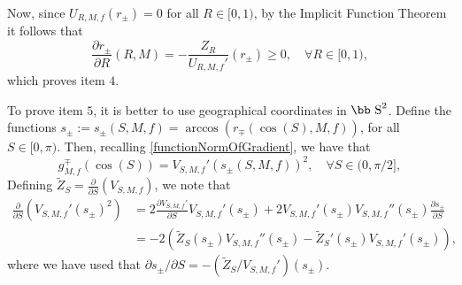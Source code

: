 \documentclass[11pt]{article}
\def\s{\hbox{\bb S}}
\numberwithin{equation} {section}
\begin{document}
Now, since $U_{R,M,f} (r_\pm) =0$ for all $R \in [0,1)$, by the Implicit Function Theorem it follows that 
	\[
	\frac{\partial r_\pm}{ \partial R} (R,M) = -\frac{Z_R}{U_{R,M,f}'} (r_\pm) \geq 0, \quad \forall R \in [0,1), 
	\]which proves item $4$.

To prove item $5$, it is better to use geographical coordinates in $\s^2$. Define the functions $s_{\pm}:= s_{\pm} (S,M,f) = \arccos (r_{\mp} (\cos (S),M,f))$, for all $S \in [0, \pi)$. Then, recalling \eqref{functionNormOfGradient}, we have that
\[
g_{M,f}^{\mp} (\cos (S)) = V_{S,M,f} ' (s_{\pm} (S,M,f))^2, \quad \forall S \in (0, \pi / 2],
\]
Defining $\tilde{Z}_S = \frac{\partial}{\partial S} (V_{S,M,f})$, we note that
\begin{equation}\label{eq:derivativeVS}
	\begin{split}
		\frac{\partial }{\partial S} \left( V_{S,M,f} ' (s_{\pm})^2 \right) &= 2 \frac{\partial V_{S,M,f} '}{\partial S} V_{S,M,f}' (s_{\pm}) + 2 V_{S,M,f} ' (s_{\pm}) V_{S,M,f} '' (s_\pm) \frac{\partial s_{\pm}}{ \partial S} \\
		&=-2 \left( \tilde{Z}_S (s_{\pm}) V_{S,M,f} '' (s_{\pm})- \tilde{Z}_S ' (s_{\pm}) V_{S,M,f} ' (s_{\pm}) \right),
	\end{split}
\end{equation}
where we have used that $\partial s_{\pm} / \partial S = -(\tilde{Z}_S / V_{S,M,f} ') (s_{\pm})$.
\end{document}
